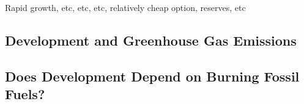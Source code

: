 Rapid growth, etc, etc, etc, relatively cheap option, reserves, etc

\subsection{Development and Greenhouse Gas Emissions}

\subsection{Does Development Depend on Burning Fossil Fuels?}







